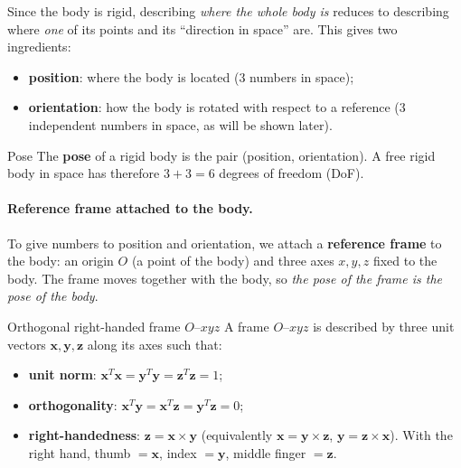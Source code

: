 Since the body is rigid, describing \emph{where the whole body is} reduces to describing where \emph{one} of its points and its ``direction in space'' are. This gives two ingredients:
\begin{itemize}
    \item \textbf{position}: where the body is located (3 numbers in space);
    \item \textbf{orientation}: how the body is rotated with respect to a reference (3 independent numbers in space, as will be shown later).
\end{itemize}

\begin{defbox}{Pose}
The \textbf{pose} of a rigid body is the pair (position, orientation). A free rigid body in space has therefore $3+3=6$ degrees of freedom (DoF).
\end{defbox}

\begin{center}
\end{center}

\paragraph{Reference frame attached to the body.} To give numbers to position and orientation, we attach a \textbf{reference frame} to the body: an origin $O$ (a point of the body) and three axes $x,y,z$ fixed to the body. The frame moves together with the body, so \emph{the pose of the frame is the pose of the body}.

\begin{defbox}{Orthogonal right-handed frame $O$--$xyz$}
A frame $O$--$xyz$ is described by three unit vectors $\mathbf{x},\mathbf{y},\mathbf{z}$ along its axes such that:
\begin{itemize}
    \item \textbf{unit norm}: $\mathbf{x}^T\mathbf{x}=\mathbf{y}^T\mathbf{y}=\mathbf{z}^T\mathbf{z}=1$;
    \item \textbf{orthogonality}: $\mathbf{x}^T\mathbf{y}=\mathbf{x}^T\mathbf{z}=\mathbf{y}^T\mathbf{z}=0$;
    \item \textbf{right-handedness}: $\mathbf{z}=\mathbf{x}\times\mathbf{y}$ (equivalently $\mathbf{x}=\mathbf{y}\times\mathbf{z}$, $\mathbf{y}=\mathbf{z}\times\mathbf{x}$). With the right hand, thumb $=\mathbf{x}$, index $=\mathbf{y}$, middle finger $=\mathbf{z}$.
\end{itemize}
\end{defbox}

